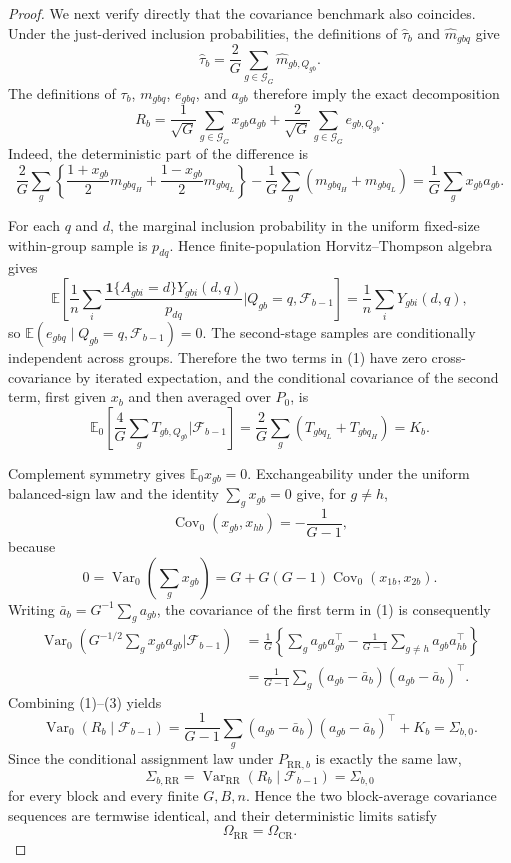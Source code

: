 \documentclass{article}
\begin{document}
\begin{proof}
We next verify directly that the covariance benchmark also coincides.  Under the just-derived inclusion probabilities, the definitions of \(\widehat\tau_b\) and \(\widehat m_{gbq}\) give
\[
 \widehat\tau_b=\frac2G\sum_{g\in\mathcal G_G}\widehat m_{gb,Q_{gb}}.
\]
The definitions of \(\tau_b\), \(m_{gbq}\), \(e_{gbq}\), and \(a_{gb}\) therefore imply the exact decomposition
\[
 R_b
 =\frac1{\sqrt G}\sum_{g\in\mathcal G_G}x_{gb}a_{gb}
  +\frac2{\sqrt G}\sum_{g\in\mathcal G_G}e_{gb,Q_{gb}}.
\tag{1}
\]
Indeed, the deterministic part of the difference is
\[
 \frac2G\sum_g\left\{\frac{1+x_{gb}}2m_{gbq_H}
 +\frac{1-x_{gb}}2m_{gbq_L}\right\}
 -\frac1G\sum_g(m_{gbq_H}+m_{gbq_L})
 =\frac1G\sum_gx_{gb}a_{gb}.
\]

For each \(q\) and \(d\), the marginal inclusion probability in the uniform fixed-size within-group sample is \(p_{dq}\).  Hence finite-population Horvitz--Thompson algebra gives
\[
 \mathbb E\!\left[
  \frac1n\sum_i\frac{\mathbf1\{A_{gbi}=d\}Y_{gbi}(d,q)}{p_{dq}}
  \mathrel{\Big|}Q_{gb}=q,\mathcal F_{b-1}\right]
 =\frac1n\sum_iY_{gbi}(d,q),
\]
so \(\mathbb E(e_{gbq}\mid Q_{gb}=q,\mathcal F_{b-1})=0\).  The second-stage samples are conditionally independent across groups.  Therefore the two terms in (1) have zero cross-covariance by iterated expectation, and the conditional covariance of the second term, first given \(x_b\) and then averaged over \(P_0\), is
\[
 \mathbb E_0\!\left[
  \frac4G\sum_gT_{gb,Q_{gb}}\mathrel{\Big|}\mathcal F_{b-1}\right]
 =\frac2G\sum_g(T_{gbq_L}+T_{gbq_H})=K_b.
\tag{2}
\]

Complement symmetry gives \(\mathbb E_0x_{gb}=0\).  Exchangeability under the uniform balanced-sign law and the identity \(\sum_gx_{gb}=0\) give, for \(g\neq h\),
\[
 \operatorname{Cov}_0(x_{gb},x_{hb})=-\frac1{G-1},
\]
because
\[
 0=\operatorname{Var}_0\!\left(\sum_gx_{gb}\right)
 =G+G(G-1)\operatorname{Cov}_0(x_{1b},x_{2b}).
\]
Writing \(\bar a_b=G^{-1}\sum_ga_{gb}\), the covariance of the first term in (1) is consequently
\[
 \begin{aligned}
 \operatorname{Var}_0\!\left(G^{-1/2}\sum_gx_{gb}a_{gb}
 \mathrel{\Big|}\mathcal F_{b-1}\right)
 &=\frac1G\left\{\sum_ga_{gb}a_{gb}^{\top}
 -\frac1{G-1}\sum_{g\neq h}a_{gb}a_{hb}^{\top}\right\}\\
 &=\frac1{G-1}\sum_g(a_{gb}-\bar a_b)(a_{gb}-\bar a_b)^{\top}.
 \end{aligned}
\tag{3}
\]
Combining (1)--(3) yields
\[
 \operatorname{Var}_0(R_b\mid\mathcal F_{b-1})
 =\frac1{G-1}\sum_g(a_{gb}-\bar a_b)(a_{gb}-\bar a_b)^{\top}+K_b
 =\Sigma_{b,0}.
\]
Since the conditional assignment law under \(P_{\mathrm{RR},b}\) is exactly the same law,
\[
 \Sigma_{b,\mathrm{RR}}
 =\operatorname{Var}_{\mathrm{RR}}(R_b\mid\mathcal F_{b-1})
 =\Sigma_{b,0}
\]
for every block and every finite \(G,B,n\).  Hence the two block-average covariance sequences are termwise identical, and their deterministic limits satisfy
\[
 \Omega_{\mathrm{RR}}=\Omega_{\mathrm{CR}}.
\]


\end{proof}
\end{document}
